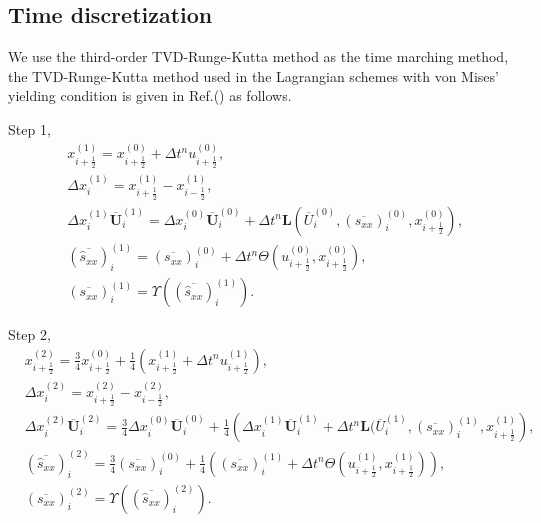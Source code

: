 \documentclass{article}
\numberwithin{equation}{section}
\numberwithin{table}{section}
\begin{document}
\subsection{Time discretization}
We use the third-order TVD-Runge-Kutta method  as the time marching method, the TVD-Runge-Kutta method used in the Lagrangian schemes with von Mises' yielding condition is given in Ref.(\cite{cheng2016harten}) as follows.

Step 1,
\begin{equation}
  \begin{aligned}
	& x_{i+\frac{1}{2}}^{(1)} = x_{i+\frac{1}{2}}^{(0)}+\Delta t^n u_{i+\frac{1}{2}}^{(0)},\\
	& \Delta x_i^{(1)} =  x_{i+\frac{1}{2}}^{(1)}- x_{i-\frac{1}{2}}^{(1)},\\
    & \Delta x_i^{(1)} \overline{\bm{U}}_i^{(1)}= \Delta x_i^{(0)} \overline{\bm{U}}_i^{(0)}+\Delta t^n \bm{L}(\overline{U}_i^{(0)}, (\overline{s_{xx}})_i^{(0)}, x_{i+\frac{1}{2}}^{(0)}),\\
	& (\overline{\hat{s}_{xx}})_i^{(1)} = (\overline{s_{xx}})_i^{(0)} +\Delta t^ n  \varTheta (u_{i+\frac{1}{2}}^{(0)}, x_{i+\frac{1}{2}}^{(0)}),\\
  & (\overline{s_{xx}})_i^{(1)} = \Upsilon((\overline{\hat{s}_{xx}})_i^{(1)}).
\end{aligned}
\end{equation}


Step 2,
\begin{equation}
  \begin{aligned}
	& x_{i+\frac{1}{2}}^{(2)} = \frac{3}{4} x_{i+\frac{1}{2}}^{(0)}+\frac{1}{4} \left( x_{i+\frac{1}{2}}^{(1)}+\Delta t^n u_{i+\frac{1}{2}}^{(1)}\right),\\
	& \Delta x_i^{(2)} =  x_{i+\frac{1}{2}}^{(2)}- x_{i-\frac{1}{2}}^{(2)},\\
	& \Delta x_i^{(2)} \overline{\bm{U}}_i^{(2)}  = \frac{3}{4} \Delta x_i^{(0)} \overline{\bm{U}}_i^{(0)}+ \frac{1}{4} \left(  \Delta x_i^{(1)} \overline{\bm{U}}_i^{(1)} + \Delta t^n \bm{L}(\overline{U}_i^{(1)}, (\overline{s_{xx}})_i^{(1)}, x_{i+\frac{1}{2}}^{(1)}\right),\\
	& (\overline{\hat{s}_{xx}})_i^{(2)} =\frac{3}{4} (\overline{s_{xx}})_i^{(0)} + \frac{1}{4} \left(  (\overline{s_{xx}})_i^{(1)}+\Delta t^ n \varTheta (u_{i+\frac{1}{2}}^{(1)}, x_{i+\frac{1}{2}}^{(1)})\right),\\
  & (\overline{s_{xx}})_i^{(2)} = \Upsilon((\overline{\hat{s}_{xx}})_i^{(2)}).
\end{aligned}
\end{equation}
\end{document}

